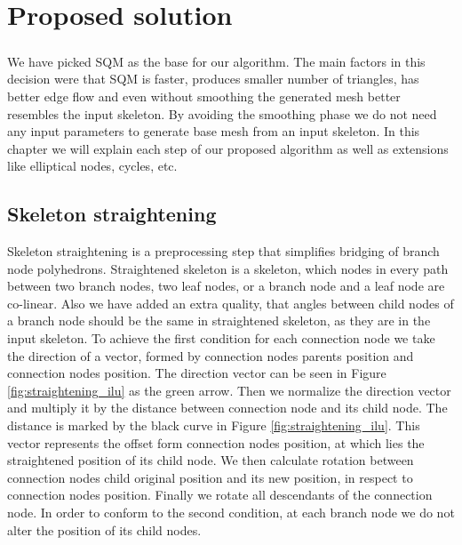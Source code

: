 \chapter{Proposed solution}\label{ch:proposed_solution}
\paragraph{}
We have picked SQM as the base for our algorithm. The main factors in this decision were that SQM is faster, produces smaller number of triangles, has better edge flow and even without smoothing the generated mesh better resembles the input skeleton. By avoiding the smoothing phase we do not need any input parameters to generate base mesh from an input skeleton. In this chapter we will explain each step of our proposed algorithm as well as extensions like elliptical nodes, cycles, etc.

\section{Skeleton straightening}\label{sec:straight}
Skeleton straightening is a preprocessing step that simplifies bridging of branch node polyhedrons. Straightened skeleton is a skeleton, which nodes in every path between two branch nodes, two leaf nodes, or a branch node and a leaf node are co-linear. Also we have added an extra quality, that angles between child nodes of a branch node should be the same in straightened skeleton, as they are in the input skeleton. To achieve the first condition for each connection node we take the direction of a vector, formed by connection nodes parents position and connection nodes position. The direction vector can be seen in Figure \ref{fig:straightening_ilu} as the green arrow. Then we normalize the direction vector and multiply it by the distance between connection node and its child node. The distance is marked by the black curve in Figure \ref{fig:straightening_ilu}. This vector represents the offset form connection nodes position, at which lies the straightened position of its child node. We then calculate rotation between connection nodes child original position and its new position, in respect to connection nodes position. Finally we rotate all descendants of the connection node. In order to conform to the second condition, at each branch node we do not alter the position of its child nodes.

